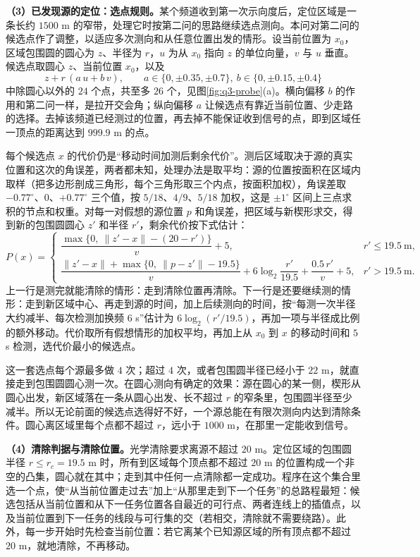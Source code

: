 \textbf{（3）已发现源的定位：选点规则。}某个频道收到第一次示向度后，定位区域是一条长约 $1500$ m 的窄带，处理它时按第二问的思路继续选点测向。本问对第二问的候选点作了调整，以适应多次测向和从任意位置出发的情形。设当前位置为 $x_0$，区域包围圆的圆心为 $z$、半径为 $r$，$u$ 为从 $x_0$ 指向 $z$ 的单位向量，$v$ 与 $u$ 垂直。候选点取圆心 $z$、当前位置 $x_0$，以及
\[
z+r\,(a\,u+b\,v),\qquad a\in\{0,\pm0.35,\pm0.7\},\ b\in\{0,\pm0.15,\pm0.4\}
\]
中除圆心以外的 $24$ 个点，共至多 $26$ 个，见图\ref{fig:q3-probe}(a)。横向偏移 $b$ 的作用和第二问一样，是拉开交会角；纵向偏移 $a$ 让候选点有靠近当前位置、少走路的选择。去掉该频道已经测过的位置，再去掉不能保证收到信号的点，即到区域任一顶点的距离达到 $999.9$ m 的点。

每个候选点 $x$ 的代价仍是“移动时间加测后剩余代价”。测后区域取决于源的真实位置和这次的角误差，两者都未知，处理办法是取平均：源的位置按面积在区域内取样（把多边形剖成三角形，每个三角形取三个内点，按面积加权），角误差取 $-0.77^\circ$、$0$、$+0.77^\circ$ 三个值，按 $5/18$、$4/9$、$5/18$ 加权，这是 $\pm1^\circ$ 区间上三点求积的节点和权重。对每一对假想的源位置 $p$ 和角误差，把区域与新楔形求交，得到新的包围圆圆心 $z'$ 和半径 $r'$，剩余代价按下式估计：
\begin{equation}\label{eq:q3-4}
P(x)=
\begin{cases}
\dfrac{\max\{0,\ \|z'-x\|-(20-r')\}}{v}+5, & r'\le19.5\ \text{m},\\[8pt]
\dfrac{\|z'-x\|+\max\{0,\ \|p-z'\|-19.5\}}{v}
+6\log_2\dfrac{r'}{19.5}+\dfrac{0.5\,r'}{v}+5, & r'>19.5\ \text{m}.
\end{cases}
\end{equation}
上一行是测完就能清除的情形：走到清除位置再清除。下一行是还要继续测的情形：走到新区域中心、再走到源的时间，加上后续测向的时间，按“每测一次半径大约减半、每次检测加换频 $6$ s”估计为 $6\log_2(r'/19.5)$，再加一项与半径成比例的额外移动。代价取所有假想情形的加权平均，再加上从 $x_0$ 到 $x$ 的移动时间和 $5$ s 检测，选代价最小的候选点。

这一套选点每个源最多做 $4$ 次；超过 $4$ 次，或者包围圆半径已经小于 $22$ m，就直接走到包围圆圆心测一次。在圆心测向有确定的效果：源在圆心的某一侧，楔形从圆心出发，新区域落在一条从圆心出发、长不超过 $r$ 的窄条里，包围圆半径至少减半。所以无论前面的候选点选得好不好，一个源总能在有限次测向内达到清除条件。圆心离区域里每个点都不超过 $r$，远小于 $1000$ m，在那里一定能收到信号。

\textbf{（4）清除判据与清除位置。}光学清除要求离源不超过 $20$ m。定位区域的包围圆半径 $r\le r_c=19.5$ m 时，所有到区域每个顶点都不超过 $20$ m 的位置构成一个非空的凸集，圆心就在其中；走到其中任何一点清除都一定成功。程序在这个集合里选一个点，使“从当前位置走过去”加上“从那里走到下一个任务”的总路程最短：候选包括从当前位置和从下一任务位置各自最近的可行点、两者连线上的插值点，以及当前位置到下一任务的线段与可行集的交（若相交，清除就不需要绕路）。此外，每一步开始时先检查当前位置：若它离某个已知源区域的所有顶点都不超过 $20$ m，就地清除，不再移动。


